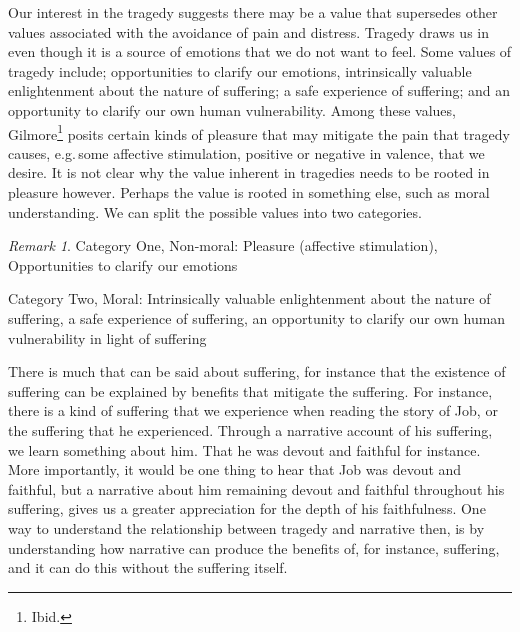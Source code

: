 \documentclass[phdthesis,12pt,final]{wuthesis}
\theoremstyle{definition}
\theoremstyle{definition}
\theoremstyle{definition}
\theoremstyle{definition}
\theoremstyle{remark}
\newtheorem*{remark}{Remark}
\begin{document}
Our interest in the tragedy suggests there may be a value that supersedes other values associated with the avoidance of pain and distress. Tragedy draws us in even though it is a source of emotions that we do not want to feel. Some values of tragedy include; opportunities to clarify our emotions, intrinsically valuable enlightenment about the nature of suffering; a safe experience of suffering; and an opportunity to clarify our own human vulnerability. Among these values, Gilmore\footnote{Ibid.} posits certain kinds of pleasure that may mitigate the pain that tragedy causes, e.g.\,some affective stimulation, positive or negative in valence, that we desire. It is not clear why the value inherent in tragedies needs to be rooted in pleasure however. Perhaps the value is rooted in something else, such as moral understanding. We can split the possible values into two categories.

\begin{remark}
Category One, Non-moral: Pleasure (affective stimulation), Opportunities to clarify our emotions

Category Two, Moral: Intrinsically valuable enlightenment about the nature of suffering, a safe experience of suffering, an opportunity to clarify our own human vulnerability in light of suffering
\end{remark}

There is much that can be said about suffering, for instance that the existence of suffering can be explained by benefits that mitigate the suffering. For instance, there is a kind of suffering that we experience when reading the story of Job, or the suffering that he experienced. Through a narrative account of his suffering, we learn something about him. That he was devout and faithful for instance. More importantly, it would be one thing to hear that Job was devout and faithful, but a narrative about him remaining devout and faithful throughout his suffering, gives us a greater appreciation for the depth of his faithfulness. One way to understand the relationship between tragedy and narrative then, is by understanding how narrative can produce the benefits of, for instance, suffering, and it can do this without the suffering itself.
\end{document}
